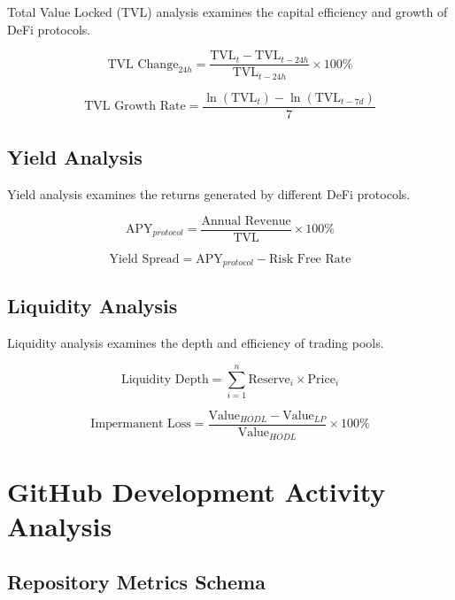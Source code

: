 \documentclass[12pt,a4paper]{article}
\begin{document}
Total Value Locked (TVL) analysis examines the capital efficiency and growth of DeFi protocols.

\begin{equation}
\text{TVL Change}_{24h} = \frac{\text{TVL}_{t} - \text{TVL}_{t-24h}}{\text{TVL}_{t-24h}} \times 100\%
\end{equation}

\begin{equation}
\text{TVL Growth Rate} = \frac{\ln(\text{TVL}_{t}) - \ln(\text{TVL}_{t-7d})}{7}
\end{equation}

\subsection{Yield Analysis}

Yield analysis examines the returns generated by different DeFi protocols.

\begin{equation}
\text{APY}_{protocol} = \frac{\text{Annual Revenue}}{\text{TVL}} \times 100\%
\end{equation}

\begin{equation}
\text{Yield Spread} = \text{APY}_{protocol} - \text{Risk Free Rate}
\end{equation}

\subsection{Liquidity Analysis}

Liquidity analysis examines the depth and efficiency of trading pools.

\begin{equation}
\text{Liquidity Depth} = \sum_{i=1}^{n} \text{Reserve}_i \times \text{Price}_i
\end{equation}

\begin{equation}
\text{Impermanent Loss} = \frac{\text{Value}_{HODL} - \text{Value}_{LP}}{\text{Value}_{HODL}} \times 100\%
\end{equation}

\section{GitHub Development Activity Analysis}

\subsection{Repository Metrics Schema}
\end{document}
